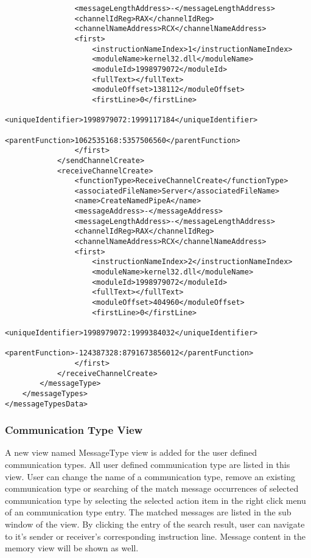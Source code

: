 \documentclass[paper=a4, fontsize=11pt]{scrartcl}
\numberwithin{equation}{section}		%
\numberwithin{figure}{section}			%
\numberwithin{table}{section}				%
\begin{document}
\begin{lstlisting}
                <messageLengthAddress>-</messageLengthAddress>
                <channelIdReg>RAX</channelIdReg>
                <channelNameAddress>RCX</channelNameAddress>
                <first>
                    <instructionNameIndex>1</instructionNameIndex>
                    <moduleName>kernel32.dll</moduleName>
                    <moduleId>1998979072</moduleId>
                    <fullText></fullText>
                    <moduleOffset>138112</moduleOffset>
                    <firstLine>0</firstLine>
                    <uniqueIdentifier>1998979072:1999117184</uniqueIdentifier>
                    <parentFunction>1062535168:5357506560</parentFunction>
                </first>
            </sendChannelCreate>
            <receiveChannelCreate>
                <functionType>ReceiveChannelCreate</functionType>
                <associatedFileName>Server</associatedFileName>
                <name>CreateNamedPipeA</name>
                <messageAddress>-</messageAddress>
                <messageLengthAddress>-</messageLengthAddress>
                <channelIdReg>RAX</channelIdReg>
                <channelNameAddress>RCX</channelNameAddress>
                <first>
                    <instructionNameIndex>2</instructionNameIndex>
                    <moduleName>kernel32.dll</moduleName>
                    <moduleId>1998979072</moduleId>
                    <fullText></fullText>
                    <moduleOffset>404960</moduleOffset>
                    <firstLine>0</firstLine>
                    <uniqueIdentifier>1998979072:1999384032</uniqueIdentifier>
                    <parentFunction>-124387328:8791673856012</parentFunction>
                </first>
            </receiveChannelCreate>
        </messageType>
    </messageTypes>
</messageTypesData>
\end{lstlisting}


\subsubsection{Communication Type View}
A new view named MessageType view is added for the user defined communication types. All user defined communication type are listed in this view. User can change the name of a communication type, remove an existing communication type or searching of the match message occurrences of selected communication type by selecting the selected action item in the right click menu of an communication type entry. The matched messages are listed in the sub window of the view. By clicking the entry of the search  result, user can navigate to it's sender or receiver's corresponding instruction line. Message content in the memory view will be shown as well.
\end{document}
